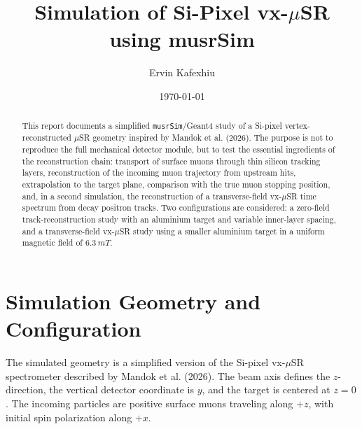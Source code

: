 \documentclass[11pt,a4paper]{article}
\title{Simulation of Si-Pixel vx-$\mu$SR using musrSim}
\author{Ervin Kafexhiu}
\date{\today}
\begin{document}
\maketitle


\begin{abstract}
This report documents a simplified \texttt{musrSim}/Geant4 study of a Si-pixel vertex-reconstructed $\mu$SR geometry inspired by Mandok et al. (2026). The purpose is not to reproduce the full mechanical detector module, but to test the essential ingredients of the reconstruction chain: transport of surface muons through thin silicon tracking layers, reconstruction of the incoming muon trajectory from upstream hits, extrapolation to the target plane, comparison with the true muon stopping position, and, in a second simulation, the reconstruction of a transverse-field vx-$\mu$SR time spectrum from decay positron tracks. Two configurations are considered: a zero-field track-reconstruction study with an aluminium target and variable inner-layer spacing, and a transverse-field vx-$\mu$SR study using a smaller aluminium target in a uniform magnetic field of $6.3~\si{mT}$.
\end{abstract}


\section{Simulation Geometry and Configuration}

The simulated geometry is a simplified version of the Si-pixel vx-$\mu$SR spectrometer described by Mandok et al. (2026). The beam axis defines the $z$-direction, the vertical detector coordinate is $y$, and the target is centered at $z=0$. The incoming particles are positive surface muons traveling along $+z$, with initial spin polarization along $+x$. 
\end{document}
